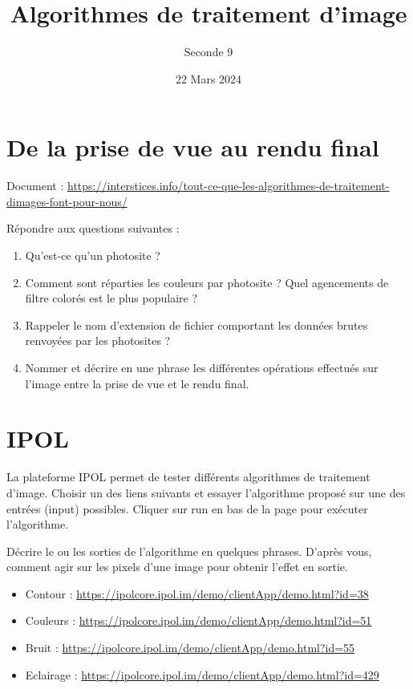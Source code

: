 \documentclass{article}
\title{Algorithmes de traitement d'image}
\author{Seconde 9}
\date{22 Mars 2024}
\begin{document}
\maketitle

\section{De la prise de vue au rendu final}

Document : \url{https://interstices.info/tout-ce-que-les-algorithmes-de-traitement-dimages-font-pour-nous/}

Répondre aux questions suivantes :
\begin{enumerate}
\item Qu'est-ce qu'un photosite ?
\item Comment sont réparties les couleurs par photosite ? Quel agencements de filtre colorés est le plus populaire ?
\item Rappeler le nom d'extension de fichier comportant les données \og brutes \fg renvoyées par les photosites ?
\item Nommer et décrire en une phrase les différentes opérations effectués sur l'image entre la prise de vue et le rendu final.
\end{enumerate}
\section{IPOL}
La plateforme IPOL permet de tester différents algorithmes de traitement d'image. Choisir un des liens suivants et essayer l'algorithme proposé sur une des entrées (input) possibles. Cliquer sur \og run \fg en bas de la page pour exécuter l'algorithme.

Décrire le ou les sorties de l'algorithme en quelques phrases. D'après vous, comment agir sur les pixels d'une image pour obtenir l'effet en sortie.
\begin{itemize}
\item Contour : \url{https://ipolcore.ipol.im/demo/clientApp/demo.html?id=38}
\item Couleurs : \url{https://ipolcore.ipol.im/demo/clientApp/demo.html?id=51}
\item Bruit : \url{https://ipolcore.ipol.im/demo/clientApp/demo.html?id=55}
\item Eclairage : \url{https://ipolcore.ipol.im/demo/clientApp/demo.html?id=429}
\end{itemize}
\end{document}
